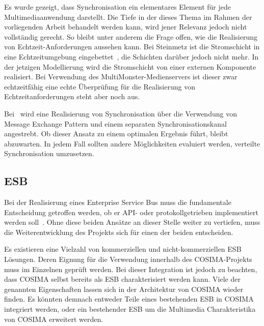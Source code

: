   Es wurde gezeigt, dass Synchronisation ein elementares Element für jede Multimediaanwendung darstellt. Die Tiefe in der dieses Thema im Rahmen der vorliegenden Arbeit behandelt werden kann, wird jener Relevanz jedoch nicht vollständig gerecht. So bleibt unter anderem die Frage offen, wie die Realisierung von Echtzeit-Anforderungen aussehen kann. Bei Steinmetz ist die Stromschicht in eine Echtzeitumgebung eingebettet~\citep[S. 604]{multimedia_technologie}, die Schichten darüber jedoch nicht mehr. In der jetzigen Modellierung wird die Stromschicht von einer externen Komponente realisiert. Bei Verwendung des MultiMonster-Medienservers ist dieser zwar echtzeitfähig eine echte Überprüfung für die Realisierung von Echtzeitanforderungen steht aber noch aus.
  
  Bei~\citep{antons09} wird eine Realisierung von Synchronisation über die Verwendung von Message Exchange Pattern und einem separaten Synchronisationskanal angestrebt. Ob dieser Ansatz zu einem optimalen Ergebnis führt, bleibt abzuwarten. In jedem Fall sollten andere Möglichkeiten evaluiert werden, verteilte Synchronisation umzusetzen.


\subsection{ESB} %
\label{sub:esb_fragen}

  Bei der Realisierung eines Enterprise Service Bus muss die fundamentale Entscheidung getroffen werden, ob er API- oder protokollgetrieben implementiert werden soll~\citep[S. 59]{soa_in_practice}. Ohne diese beiden Ansätze an dieser Stelle weiter zu vertiefen, muss die Weiterentwicklung des Projekts sich für einen der beiden entscheiden.
  
  Es existieren eine Vielzahl von kommerziellen und nicht-kommerziellen ESB Lösungen. Deren Eignung für die Verwendung innerhalb des COSIMA-Projekts muss im Einzelnen geprüft werden. Bei dieser Integration ist jedoch zu beachten, dass COSIMA selbst bereits als ESB charakterisiert werden kann. Viele der genannten Eigenschaften lassen sich in der Architektur von COSIMA wieder finden. Es könnten demnach entweder Teile eines bestehenden ESB in COSIMA integriert werden, oder ein bestehender ESB um die Multimedia Charakteristika von COSIMA erweitert werden.



